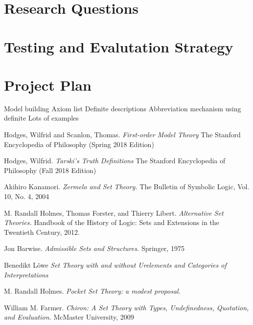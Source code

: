 \documentclass[12pt]{article}
\theoremstyle{definition}
\begin{document}
\section{Research Questions}


\section{Testing and Evalutation Strategy}

\section{Project Plan}
Model building
Axiom list
Definite descriptions
Abbreviation mechanism using definite
Lots of examples

\begin{thebibliography}{9}
Hodges, Wilfrid and Scanlon, Thomas.
\textit{First-order Model Theory}
The Stanford Encyclopedia of Philosophy (Spring 2018 Edition)

Hodges, Wilfrid.
\textit{Tarski's Truth Definitions}
The Stanford Encyclopedia of Philosophy (Fall 2018 Edition)

Akihiro Kanamori.
\textit{Zermelo and Set Theory.}
The Bulletin of Symbolic Logic, Vol. 10, No. 4, 2004

M. Randall Holmes, Thomas Forster, and Thierry Libert.
\textit{Alternative Set Theories.}
Handbook of the History of Logic: Sets and Extensions in the Twentieth Century, 2012.

Jon Barwise.
\textit{Admissible Sets and Structures.}
Springer, 1975

Benedikt L\"owe
\textit{Set Theory with and without Urelements and Categories of Interpretations}

M. Randall Holmes.
\textit{Pocket Set Theory: a modest proposal.}

William M. Farmer.
\textit{Chiron: A Set Theory with Types,
Undefinedness, Quotation, and Evaluation.}
McMaster University, 2009

\end{thebibliography}
\end{document}
